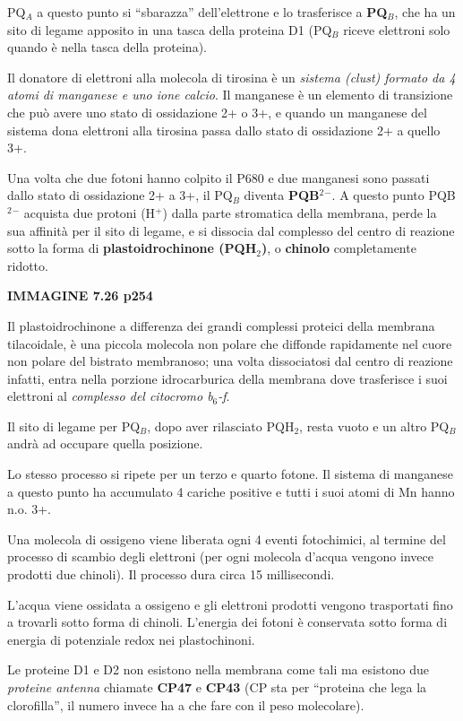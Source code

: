 \documentclass[]{article}
\begin{document}
PQ$_A$ a questo punto si ``sbarazza'' dell'elettrone e lo trasferisce a
\textbf{PQ$_B$}, che ha un sito di legame apposito in una tasca della
proteina D1 (PQ$_B$ riceve elettroni solo quando è nella tasca della
proteina).

Il donatore di elettroni alla molecola di tirosina è un \emph{sistema
(clust) formato da 4 atomi di manganese e uno ione calcio}. Il manganese
è un elemento di transizione che può avere uno stato di ossidazione 2+ o
3+, e quando un manganese del sistema dona elettroni alla tirosina passa
dallo stato di ossidazione 2+ a quello 3+.

Una volta che due fotoni hanno colpito il P680 e due manganesi sono
passati dallo stato di ossidazione 2+ a 3+, il PQ$_B$ diventa
\textbf{PQB$^2$$^-$}. A questo punto PQB$^2$$^-$ acquista due protoni
(H$^+$) dalla parte stromatica della membrana, perde la sua affinità per
il sito di legame, e si dissocia dal complesso del centro di reazione
sotto la forma di \textbf{plastoidrochinone (PQH$_2$)}, o
\textbf{chinolo} completamente ridotto.

\textbf{IMMAGINE 7.26 p254}

Il plastoidrochinone a differenza dei grandi complessi proteici della
membrana tilacoidale, è una piccola molecola non polare che diffonde
rapidamente nel cuore non polare del bistrato membranoso; una volta
dissociatosi dal centro di reazione infatti, entra nella porzione
idrocarburica della membrana dove trasferisce i suoi elettroni al
\emph{complesso del citocromo b$_6$-f}.

Il sito di legame per PQ$_B$, dopo aver rilasciato PQH$_2$, resta vuoto
e un altro PQ$_B$ andrà ad occupare quella posizione.

Lo stesso processo si ripete per un terzo e quarto fotone. Il sistema di
manganese a questo punto ha accumulato 4 cariche positive e tutti i suoi
atomi di Mn hanno n.o. 3+.

Una molecola di ossigeno viene liberata ogni 4 eventi fotochimici, al
termine del processo di scambio degli elettroni (per ogni molecola
d'acqua vengono invece prodotti due chinoli). Il processo dura circa 15
millisecondi.

L'acqua viene ossidata a ossigeno e gli elettroni prodotti vengono
trasportati fino a trovarli sotto forma di chinoli. L'energia dei fotoni
è conservata sotto forma di energia di potenziale redox nei
plastochinoni.

Le proteine D1 e D2 non esistono nella membrana come tali ma esistono
due \emph{proteine antenna} chiamate \textbf{CP47} e \textbf{CP43} (CP
sta per ``proteina che lega la clorofilla'', il numero invece ha a che
fare con il peso molecolare).
\end{document}
